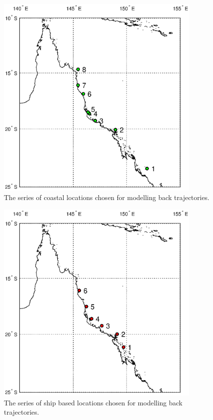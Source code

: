 \begin{figure}[!htb]
    \centering
    \includegraphics[width=0.9\textwidth]{Fig/Research/CoastLocs.eps}
    \caption{The series of coastal locations chosen for modelling back trajectories. }
    \label{fig:coastlocs}
\end{figure}

\begin{figure}[!htb]
    \centering
    \includegraphics[width=0.9\textwidth]{Fig/Research/ShipLocs.eps}
    \caption{The series of ship based locations chosen for modelling back trajectories. }
    \label{fig:shiplocs}
\end{figure}


